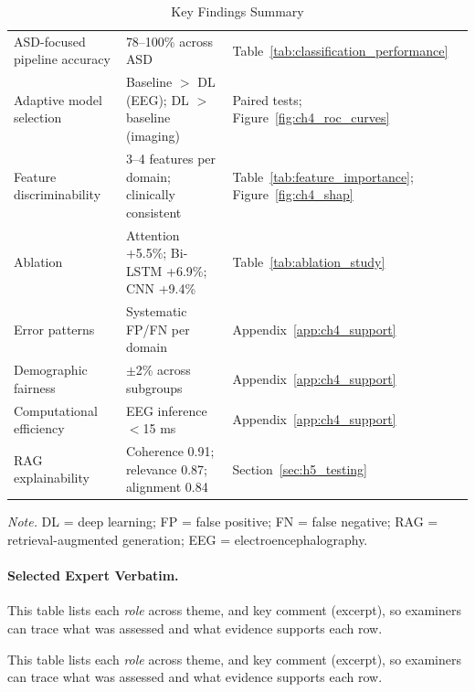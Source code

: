 {\tablestripes\tablefontsize
{}
\begin{xltabular}{\textwidth}{@{} >{\raggedright\arraybackslash}p{2.8cm} L L @{}}
\caption[Key Findings Summary]{Key Findings Summary}\label{tab:key_findings_summary} \\
\toprule
{} &  &  \\
\midrule
\endfirsthead
\endhead
\bottomrule
\endlastfoot
ASD-focused pipeline accuracy & 78--100\% across ASD & Table~\ref{tab:classification_performance} \\
\addlinespace
Adaptive model selection & Baseline $>$ DL (EEG); DL $>$ baseline (imaging) & Paired tests; Figure~\ref{fig:ch4_roc_curves} \\
\addlinespace
Feature discriminability & 3--4 features per domain; clinically consistent & Table~\ref{tab:feature_importance}; Figure~\ref{fig:ch4_shap} \\
\addlinespace
Ablation & Attention +5.5\%; Bi-LSTM +6.9\%; CNN +9.4\% & Table~\ref{tab:ablation_study} \\
\addlinespace
Error patterns & Systematic FP/FN per domain & Appendix~\ref{app:ch4_support} \\
\addlinespace
Demographic fairness & $\pm$2\% across subgroups & Appendix~\ref{app:ch4_support} \\
\addlinespace
Computational efficiency & EEG inference $<$15 ms & Appendix~\ref{app:ch4_support} \\
\addlinespace
RAG explainability & Coherence 0.91; relevance 0.87; alignment 0.84 & Section~\ref{sec:h5_testing} \\
\end{xltabular}}
\vspace{0.5em}\noindent\textit{Note.} DL = deep learning; FP = false positive; FN = false negative; RAG = retrieval-augmented generation; EEG = electroencephalography.

\paragraph{Selected Expert Verbatim.}



\noindent This table lists each \textit{role} across theme, and key comment (excerpt), so examiners can trace what was assessed and what evidence supports each row.



\noindent This table lists each \textit{role} across theme, and key comment (excerpt), so examiners can trace what was assessed and what evidence supports each row.


